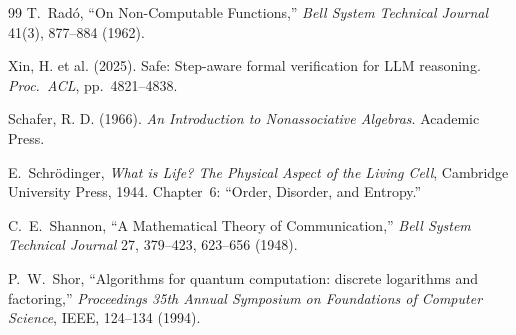 \begin{thebibliography}{99}
T.~Rad\'o,
``On Non-Computable Functions,''
\emph{Bell System Technical Journal} 41(3), 877--884 (1962).

Xin, H. et al. (2025). Safe: Step-aware formal verification for LLM reasoning. \emph{Proc.\ ACL}, pp.~4821--4838.

Schafer, R. D. (1966). \emph{An Introduction to Nonassociative Algebras}. Academic Press.

E.~Schr\"odinger,
\emph{What is Life? The Physical Aspect of the Living Cell},
Cambridge University Press, 1944.
Chapter~6: ``Order, Disorder, and Entropy.''

C.~E.~Shannon,
``A Mathematical Theory of Communication,''
\emph{Bell System Technical Journal} 27, 379--423, 623--656 (1948).

P.~W.~Shor,
``Algorithms for quantum computation: discrete logarithms and factoring,''
\emph{Proceedings 35th Annual Symposium on Foundations of Computer Science}, IEEE, 124--134 (1994).

\end{thebibliography}
